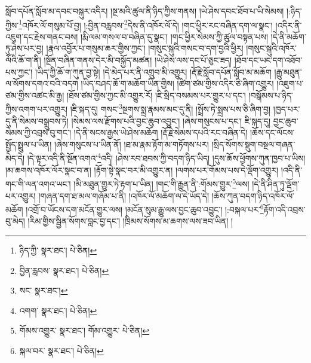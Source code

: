 སློབ་དཔོན་སློབ་མ་དབང་བསྐུར་འདིར། །སྔ་མའི་ཚུལ་ནི་ཉིད་ཀྱིས་གནས། །ཡེ་ཤེས་དབང་ཐོབ་པ་ཡི་སེམས། །:ཉིད་ཀྱིས་\footnote{ཉིད་ཀྱི་  སྣར་ཐང་།  པེ་ཅིན། }འཁོར་ལོ་གསུམ་པོ་བྱ། །:བྱིན་བརླབས་\footnote{བྱིན་རླབས་  སྣར་ཐང་།  པེ་ཅིན། }དེས་ནི་འཁོར་ལོ་དེ། །གང་ཕྱིར་རང་བཞིན་དག་ལ་སྣང་། །འདིར་ནི་འཇུག་དང་རྗེས་གནང་བས། །རྨི་ལམ་གསལ་བ་བཞིན་དུ་སྣང་། །གང་ཕྱིར་སེམས་ཀྱི་ཚུལ་བསྟན་པས། །དེ་ནི་མཆོག་ཏུ་ཤེས་པར་བྱ། །རྣལ་འབྱོར་པ་གསུམ་ཆར་གྱིས་ཀྱང་། །གསུང་སྐུའི་གསང་བ་དག་བྱའི་ཕྱིར། །གསུང་སྐུའི་འཁོར་ལོའི་ཆོ་ག་ནི། །སྔོན་བཞིན་གནས་དེར་མི་བསྐྱོད་མཚན། །ཡེ་ཤེས་ལས་དང་པོ་ཅུང་ཟད། །ཐོབ་དང་ཡང་དག་འཐོབ་པས་ཀྱང་། །ཡིད་ཀྱི་ཆོ་ག་ཀུན་བྱ་སྟེ། །དེ་མེད་པར་ནི་འགྲུབ་མི་འགྱུར། །རྡོ་རྗེ་སློབ་དཔོན་སློབ་མ་མཆོག །རྒྱུ་མཐུན་ལ་སོགས་དགའ་བའི་བདག །ཡིད་བཤད་ཆོ་ག་མཆོག་ཡིན་གྱིས། །ཚིག་ཙམ་གྱིས་འདིར་ཅི་ཞིག་འགྱུར། །འཇུག་པ་ཙམ་གྱིས་འཚང་མི་རྒྱ། །ཐོས་ཙམ་གྱིས་ཀྱང་མི་འགྱུར་རོ། །ཇི་སྲིད་བསམས་པར་གྱུར་པ་དང་། །བསྒོམས་པ་ཉིད་ཀྱིས་འགག་པར་འགྱུར། །ཇི་སྐད་དུ། གསང་\footnote{སང་  སྣར་ཐང་། }སྔགས་སྨྲ་རྣམས་མང་དུ་ནི། །སྤྲོས་ཏེ་སྨྲས་པས་ཅི་ཞིག་བྱ། །ཁྱད་པར་དུ་ནི་སེམས་བསྒྲུབས་ཏེ། །སེམས་ལས་རྫོགས་པའི་བྱང་ཆུབ་འབྱུང་། །ཞེས་གསུངས་པ་དང་། ཇི་སྐད་དུ། བྱང་ཆུབ་སེམས་ཀྱི་འབྲས་བུ་གང་། །དེ་ནི་སངས་རྒྱས་ཡེ་ཤེས་མཆོག །རྡོ་རྗེ་སེམས་དཔའི་རང་བཞིན་དེ། །ཆོས་དང་ལོངས་སྤྱོད་སྤྲུལ་པ་ཡིན། །ཞེས་གསུངས་པ་ཡིན་ནོ། །ཐ་མ་རྣམ་རྟོག་མ་གཏོགས་པར། །སྲིད་སོགས་སྡུག་བསྔལ་གཞན་མེད་དེ། །དེ་ལྟར་འདི་ནི་སྔོན་འགའ་\footnote{འགག་  སྣར་ཐང་།  པེ་ཅིན། }འདི། །ཤེས་རབ་ཐབས་ཀྱི་བདག་ཉིད་ཡིད། །དུས་ཆོས་ཕྱོགས་ཀུན་ཁྱབ་པ་ཡིས། །མ་ཆགས་འཁོར་ལོར་སྣང་བ་ན། །རྟོག་སྟེ་སྣང་བར་མི་འགྱུར་ན། །ལགས་པར་གོམས་པས་དེ་ལྡོག་འགྱུར། །འདི་ནི་གང་གི་ལན་འགའ་ཡང་། །མི་མཐུན་གྱུར་ཏེ་རྟག་པ་ཡིན། །གང་གི་རྒྱུན་ནི་:གོམས་གྱུར་\footnote{གོམས་འགྱུར་  སྣར་ཐང་། གོམ་འགྱུར་  པེ་ཅིན། }ལས། །དེ་ནི་ཤིན་ཏུ་ལྡོག་པར་འགྱུར། །གཞན་དག་ཐ་མལ་གཞོམ་པ་ནི། །འཁོར་ལོ་མཆོག་ལ་དེ་ཡོད་དེ། །ཆོས་ཀུན་བདག་ཉིད་འཁོར་ལོ་མཆོག །འགྲོ་བ་ཡོངས་དག་མངོན་གྱུར་ལས། །མངོན་སུམ་རྒྱུ་ལས་བྱང་ཆུབ་འབྱུང་། །:བསྐལ་པར་\footnote{སྐལ་བར་  སྣར་ཐང་།  པེ་ཅིན། }རྟོག་འདི་འབྲས་བུ་མེད། །རིམ་གྱིས་སྦྱིན་སོགས་བླང་བྱ་དང་། །ཁྲིམས་སོགས་མ་ཆགས་ལས་ཟབ་ཡིན། །
